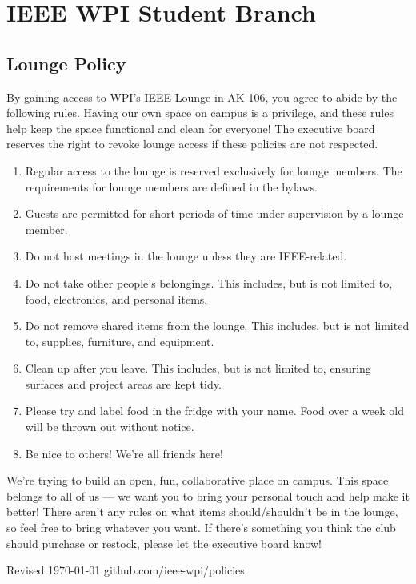 \documentclass[12pt]{report}
\begin{document}
\section*{IEEE WPI Student Branch}
\subsection*{Lounge Policy}
By gaining access to WPI's IEEE Lounge in AK 106, you agree to abide by the following rules. Having our own space on campus is a privilege, and these rules help keep the space functional and clean for everyone! The executive board reserves the right to revoke lounge access if these policies are not respected.

\begin{enumerate}
    \item{Regular access to the lounge is reserved exclusively for lounge members. The requirements for lounge members are defined in the bylaws.}
    \item{Guests are permitted for short periods of time under supervision by a lounge member.}
    \item{Do not host meetings in the lounge unless they are IEEE-related.}
    \item{Do not take other people's belongings. This includes, but is not limited to, food, electronics, and personal items.}
    \item{Do not remove shared items from the lounge. This includes, but is not limited to, supplies, furniture, and equipment.}
    \item{Clean up after you leave. This includes, but is not limited to, ensuring surfaces and project areas are kept tidy.}
    \item{Please try and label food in the fridge with your name.  Food over a week old will be thrown out without notice.}
    \item{Be nice to others! We're all friends here! \Large\smiley{}}
\end{enumerate}

\noindent We're trying to build an open, fun, collaborative place on campus. This space belongs to all of us — we want you to bring your personal touch and help make it better! There aren't any rules on what items should/shouldn't be in the lounge, so feel free to bring whatever you want. If there's something you think the club should purchase or restock, please let the executive board know!

\vspace{\fill}
\noindent \normalsize{Revised \today}
\hspace{\fill}
github.com/ieee-wpi/policies
\end{document}
